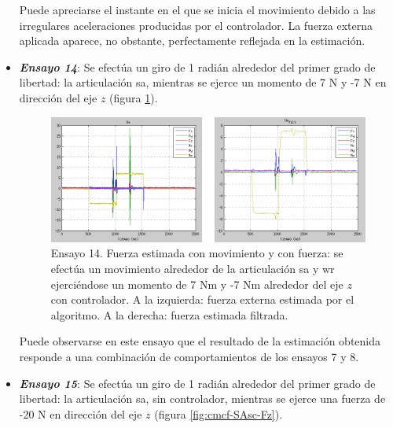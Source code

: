 \begin{itemize}
Puede apreciarse el instante en el que se inicia el movimiento debido a las irregulares aceleraciones producidas por el controlador. La fuerza externa aplicada aparece, no obstante, perfectamente reflejada en la estimación. \par 

\item \textbf{\emph{Ensayo 14}}: Se efectúa un giro de 1 radián alrededor del primer grado de libertad: la articulación \acrshort{sa}, mientras se ejerce un momento de 7 N y -7 N en dirección del eje $z$ (figura \ref{fig:cmcf-SA-Nz}). \par 

\begin{figure}[h!]
\centering
\includegraphics[scale=0.4]{Figuras/cmcf-SA-Nz}
\caption[Ensayo 14. Fuerza estimada con movimiento y con fuerza]{Ensayo 14. Fuerza estimada con movimiento y con fuerza: se efectúa un movimiento alrededor de la articulación \acrshort{sa} y \acrshort{wr} ejerciéndose un momento de 7 Nm y -7 Nm alrededor del eje $z$ con controlador. A la izquierda: fuerza externa estimada por el algoritmo. A la derecha: fuerza estimada filtrada.}
\label{fig:cmcf-SA-Nz}
\end{figure}

Puede observarse en este ensayo que el resultado de la estimación obtenida responde a una combinación de comportamientos de los ensayos 7 y 8. \par  

\item \textbf{\emph{Ensayo 15}}: Se efectúa un giro de 1 radián alrededor del primer grado de libertad: la articulación \acrshort{sa}, sin controlador, mientras se ejerce una fuerza de -20 N en dirección del eje $z$ (figura \ref{fig:cmcf-SAsc-Fz}). \par 


\end{itemize}
